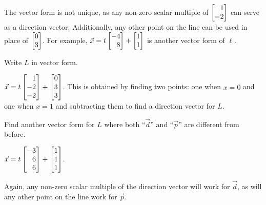 \documentclass{workbook}
\begin{document}
\begin{slide}
\begin{parts}
\begin{solution}
				The vector form is not unique, as any non-zero scalar multiple of
				$\mat{1 \\ -2}$ can serve as a direction vector. Additionally,
				any other point on the line can be used in place of
				$\mat{0 \\3}$. For example,  $\vec x = t \mat{-4 \\ 8} + \mat{1 \\ 1}$
				is another vector form of $\ell$.
			\end{solution}
		\item Write $L$ in vector form.
			\begin{solution}[inline]
				$\vec x = t\mat{1 \\ -2 \\ -2} + \mat{0 \\ 3 \\ 3}$. This is obtained
				by finding two points: one when $x=0$ and one when $x=1$ and subtracting
				them to find a direction vector for $L$.
			\end{solution}
		\item Find another vector form for $L$ where both ``$\vec d$'' and
			``$\vec p$'' are different from before.
			\begin{solution}
				$\vec x = t \mat{-3 \\ 6 \\ 6} + \mat{1 \\ 1 \\ 1}$.

				Again, any non-zero scalar multiple of the direction vector
				will work for $\vec d$, as will any other point on the line
				work for $\vec p$.
			\end{solution}
	\end{parts}
\end{slide}
\end{document}
